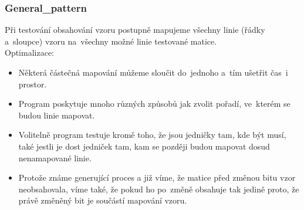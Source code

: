 \documentclass{beamer}
\begin{document}
\begin{frame}
\frametitle{General\_pattern}
Při testování obsahování vzoru postupně mapujeme všechny linie (řádky a~sloupce) vzoru na~všechny možné linie testované matice.\\
\vspace{1em}
Optimalizace:
\begin{itemize}
\item Některá částečná mapování můžeme sloučit do~jednoho a~tím ušetřit čas~i prostor.
\pause
\item Program poskytuje mnoho různých způsobů jak zvolit pořadí, ve~kterém se budou linie mapovat.
\pause
\item Volitelně program testuje kromě toho, že jsou jedničky tam, kde být musí, také jestli je dost jedniček tam, kam se později budou mapovat dosud nenamapované linie.
\pause
\item Protože známe generující proces a již víme, že matice před změnou bitu vzor neobsahovala, víme také, že pokud ho po~změně obsahuje tak jedině proto, že právě změněný bit je součástí mapování vzoru.
\end{itemize}
\end{frame}

\end{document}

